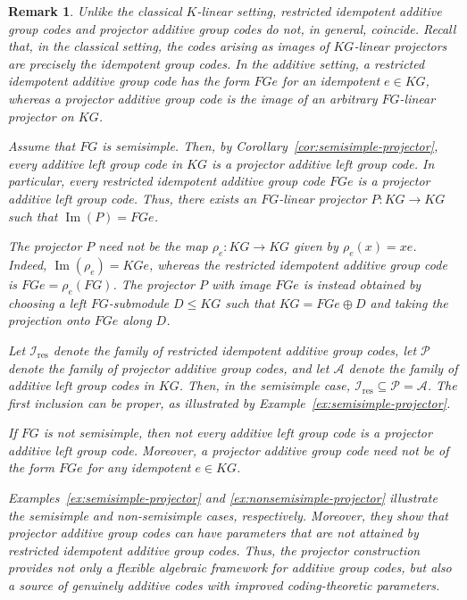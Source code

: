 \documentclass[11pt]{article}
\newtheorem{remark}[theorem]{Remark}
\begin{document}
\begin{remark}\label{rem:projector-vs-restricted-idempotent}
Unlike the classical $K$-linear setting, restricted idempotent additive group
codes and projector additive group codes do not, in general, coincide.
Recall that, in the classical setting, the codes arising as images of
$KG$-linear projectors are precisely the idempotent group codes. In the
additive setting, a restricted idempotent additive group code has the form
$FGe$ for an idempotent $e\in KG$, whereas a projector additive group code is
the image of an arbitrary $FG$-linear projector on $KG$.

Assume that $FG$ is semisimple. Then, by
Corollary~\ref{cor:semisimple-projector}, every additive left group code in
$KG$ is a projector additive left group code. In particular, every restricted
idempotent additive group code $FGe$ is a projector additive left group code.
Thus, there exists an $FG$-linear projector $P:KG\longrightarrow KG$ such
that $\operatorname{Im}(P)=FGe$.

The projector $P$ need not be the map
$\rho_e:KG\longrightarrow KG$ given by $\rho_e(x)=xe$. Indeed,
$\operatorname{Im}(\rho_e)=KGe$, whereas the restricted idempotent additive
group code is $FGe=\rho_e(FG)$. The projector $P$ with image $FGe$ is instead
obtained by choosing a left $FG$-submodule $D\leq KG$ such that
$KG=FGe\oplus D$ and taking the projection onto $FGe$ along $D$.

Let $\mathcal{I}_{\mathrm{res}}$ denote the family of restricted idempotent
additive group codes, let $\mathcal{P}$ denote the family of projector
additive group codes, and let $\mathcal{A}$ denote the family of additive
left group codes in $KG$. Then, in the semisimple case,
$\mathcal{I}_{\mathrm{res}}\subseteq\mathcal{P}=\mathcal{A}$. The first
inclusion can be proper, as illustrated by
Example~\ref{ex:semisimple-projector}.

If $FG$ is not semisimple, then not every additive left group code is a
projector additive left group code. Moreover, a projector additive group code
need not be of the form $FGe$ for any idempotent $e\in KG$.

Examples~\ref{ex:semisimple-projector} and
\ref{ex:nonsemisimple-projector} illustrate the semisimple and
non-semisimple cases, respectively. Moreover, they show that projector additive group
codes can have parameters that are not attained by restricted idempotent
additive group codes. Thus, the projector construction provides not only a
flexible algebraic framework for additive group codes, but also a source of
genuinely additive codes with improved coding-theoretic parameters.
\end{remark}
\end{document}
